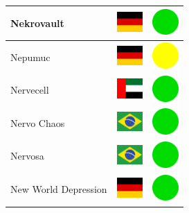 \documentclass[12pt, a4paper, twoside]{report}
\begin{document}
\begin{center}
\begin{longtable}{|p{5cm}|p{2cm}|p{2cm}|}
 Nekrovault                                                 & \includegraphics[width=1cm]{../img/flags/de} &   \includegraphics[width=1cm]{../likes/y} \\ \hline
 Nepumuc                                                    & \includegraphics[width=1cm]{../img/flags/de} &   \includegraphics[width=1cm]{../likes/m} \\ \hline
 Nervecell                                                  & \includegraphics[width=1cm]{../img/flags/ae} &   \includegraphics[width=1cm]{../likes/y} \\ \hline
 Nervo Chaos                                                & \includegraphics[width=1cm]{../img/flags/br} &   \includegraphics[width=1cm]{../likes/y} \\ \hline
 Nervosa                                                    & \includegraphics[width=1cm]{../img/flags/br} &   \includegraphics[width=1cm]{../likes/y} \\ \hline
 New World Depression                                       & \includegraphics[width=1cm]{../img/flags/de} &   \includegraphics[width=1cm]{../likes/y} \\ \hline

\end{longtable}
\end{center}
\end{document}
